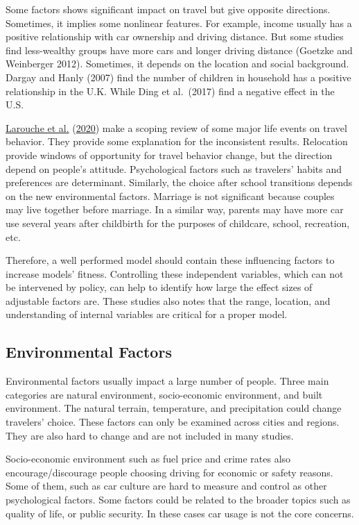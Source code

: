 \documentclass[
  11pt,
  openany]{memoir}
\begin{document}
Some factors shows significant impact on travel but give opposite directions. Sometimes, it implies some nonlinear features. For example, income usually has a positive relationship with car ownership and driving distance. But some studies find less-wealthy groups have more cars and longer driving distance (Goetzke and Weinberger 2012). Sometimes, it depends on the location and social background. Dargay and Hanly (2007) find the number of children in household has a positive relationship in the U.K. While Ding et al.~(2017) find a negative effect in the U.S.

\protect\hyperlink{ref-laroucheEffectMajorLife2020}{Larouche et al.} (\protect\hyperlink{ref-laroucheEffectMajorLife2020}{2020}) make a scoping review of some major life events on travel behavior. They provide some explanation for the inconsistent results. Relocation provide windows of opportunity for travel behavior change, but the direction depend on people's attitude. Psychological factors such as travelers' habits and preferences are determinant. Similarly, the choice after school transitions depends on the new environmental factors. Marriage is not significant because couples may live together before marriage. In a similar way, parents may have more car use several years after childbirth for the purposes of childcare, school, recreation, etc.

Therefore, a well performed model should contain these influencing factors to increase models' fitness. Controlling these independent variables, which can not be intervened by policy, can help to identify how large the effect sizes of adjustable factors are. These studies also notes that the range, location, and understanding of internal variables are critical for a proper model.

\hypertarget{environmental-factors}{%
\subsection{Environmental Factors}\label{environmental-factors}}

Environmental factors usually impact a large number of people. Three main categories are natural environment, socio-economic environment, and built environment. The natural terrain, temperature, and precipitation could change travelers' choice. These factors can only be examined across cities and regions. They are also hard to change and are not included in many studies.

Socio-economic environment such as fuel price and crime rates also encourage/discourage people choosing driving for economic or safety reasons. Some of them, such as car culture are hard to measure and control as other psychological factors. Some factors could be related to the broader topics such as quality of life, or public security. In these cases car usage is not the core concerns.
\end{document}
